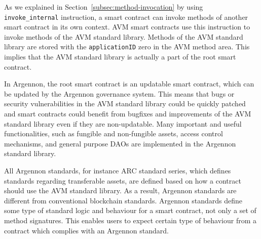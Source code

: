 As we explained in Section~\ref{subsec:method-invocation} by using \texttt{invoke\_internal} instruction, a smart
contract can invoke methods of another smart contract in its own context. AVM smart contracts use this instruction to
invoke methods of the AVM standard library. Methods of the AVM standard library are stored
with the \texttt{applicationID} zero in the AVM method area. This implies that the AVM standard library is actually
a part of the root smart contract.

In Argennon, the root smart contract is an updatable smart contract, which can be updated by the Argennon governance
system. This means that bugs or security vulnerabilities in the AVM standard library could be quickly patched and
smart contracts could benefit from bugfixes and improvements of the AVM standard library even if they are
non-updatable. Many important and useful functionalities,
such as fungible and non-fungible assets, access control mechanisms,
and general purpose DAOs are implemented in the Argennon standard library.

All Argennon standards, for instance ARC standard series, which defines standards regarding transferable assets,
are defined based on how a contract should use the AVM standard library. As a result, Argennon standards are
different from conventional blockchain standards. Argennon standards define some type of standard logic and
behaviour for a smart contract, not only a set of method signatures. This enables users to expect certain type
of behaviour from a contract which complies with an Argennon standard.
